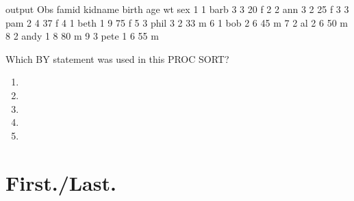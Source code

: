 \begin{frame}[fragile]
\footnotesize
\begin{craw}{.0}{output}
Obs famid kidname birth age  wt sex
1     1    barb     3    3   20  f
2     2    ann      3    2   25  f
3     3    pam      2    4   37  f
4     1    beth     1    9   75  f
5     3    phil     3    2   33  m
6     1    bob      2    6   45  m
7     2    al       2    6   50  m
8     2    andy     1    8   80  m
9     3    pete     1    6   55  m
\end{craw}
\emp
{} \hspace{0.05in} \emp
{}
\begin{clicker}{Which BY statement was used in this PROC SORT?}
\begin{enumerate}
\item {}
\item {}
\item {}
\item {}
\item {} %
\end{enumerate}
\end{clicker}
\emp
\end{frame}


\section[First./Last.]{First./Last.}
\subsection{}
\begin{frame}
\end{frame}

